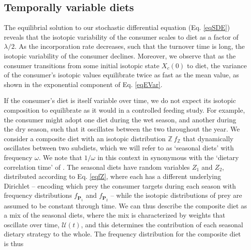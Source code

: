 \documentclass{frontiersSCNS}
\begin{document}




\subsection*{Temporally variable diets}
The equilibrial solution to our stochastic differential equation (Eq. \ref{eqSDE}) reveals that the isotopic variability of the consumer scales to diet as a factor of $\lambda/2$.
As the incorporation rate decreases, such that the turnover time is long, the isotopic variability of the consumer declines.
Moreover, we observe that as the consumer transitions from some initial isotopic state $X_c(0)$ to diet, the variance of the consumer's isotopic values equilibrate twice as fast as the mean value, as shown in the exponential component of Eq. \ref{eqEVar}.

If the consumer's diet is itself variable over time, we do not expect its isotopic composition to equilibrate as it would in a controlled feeding study.
For example, the consumer might adopt one diet during the wet season, and another during the dry season, such that it oscillates between the two throughout the year.
We consider a composite diet with an isotopic distribution $\mathbb Z ~ f_{\mathbb Z}$ that dynamically oscillates between two subdiets, which we will refer to as `seasonal diets' with frequency $\omega$.
We note that $1/\omega$ in this context in synonymous with the `dietary correlation time' of \citet{Fink:2012eg}.
The seasonal diets have random variables $Z_1$ and $Z_2$, distributed according to Eq. \ref{eqfZ}, where each has a different underlying Dirichlet -- encoding which prey the consumer targets during each season with frequency distributions $f_{\bm P_1}$ and $f_{\bm P_2}$ -- while the isotopic distributions of prey are assumed to be constant through time.
We can thus describe the composite diet as a mix of the seasonal diets, where the mix is characterized by weights that oscillate over time, $\mathcal{U}(t)$, and this determines the contribution of each seasonal dietary strategy to the whole.
The frequency distribution for the composite diet is thus
\end{document}
